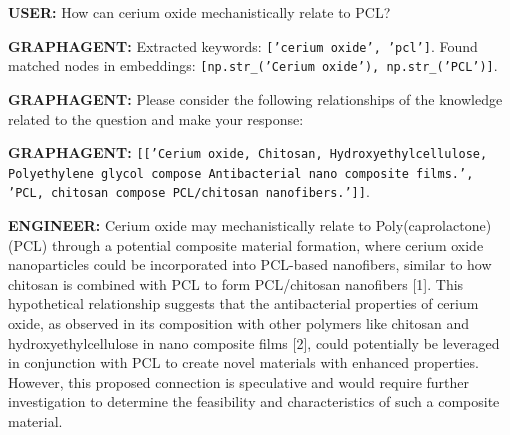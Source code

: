 \documentclass{article}
\begin{document}
\begin{rightbubbles}
\textbf{USER:} How can cerium oxide mechanistically relate to PCL? 
\end{rightbubbles}

\begin{leftbubbles}
\textbf{GRAPHAGENT:} Extracted keywords: \texttt{['cerium oxide', 'pcl']}. 
Found matched nodes in embeddings: \texttt{[np.str\_('Cerium oxide'), np.str\_('PCL')]}.

\textbf{GRAPHAGENT:} Please consider the following relationships of the knowledge related to the question and make your response: 

\textbf{GRAPHAGENT:} \texttt{[['Cerium oxide, Chitosan, Hydroxyethylcellulose, Polyethylene glycol compose Antibacterial nano composite films.', 'PCL, chitosan compose PCL/chitosan nanofibers.']]}.
\end{leftbubbles}

\begin{rightbubbles}
\textbf{ENGINEER:} Cerium oxide may mechanistically relate to Poly(caprolactone) (PCL) through a potential composite material formation, where cerium oxide nanoparticles could be incorporated into PCL-based nanofibers, similar to how chitosan is combined with PCL to form PCL/chitosan nanofibers [1]. This hypothetical relationship suggests that the antibacterial properties of cerium oxide, as observed in its composition with other polymers like chitosan and hydroxyethylcellulose in nano composite films [2], could potentially be leveraged in conjunction with PCL to create novel materials with enhanced properties. However, this proposed connection is speculative and would require further investigation to determine the feasibility and characteristics of such a composite material.
\end{rightbubbles}
\end{document}
